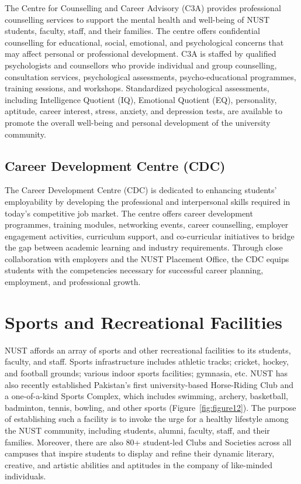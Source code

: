 The Centre for Counselling and Career Advisory (C3A) provides professional counselling services to support the mental health and well-being of NUST students, faculty, staff, and their families. The centre offers confidential counselling for educational, social, emotional, and psychological concerns that may affect personal or professional development. C3A is staffed by qualified psychologists and counsellors who provide individual and group counselling, consultation services, psychological assessments, psycho-educational programmes, training sessions, and workshops. Standardized psychological assessments, including Intelligence Quotient (IQ), Emotional Quotient (EQ), personality, aptitude, career interest, stress, anxiety, and depression tests, are available to promote the overall well-being and personal development of the university community.

\subsection{Career Development Centre (CDC)}

The Career Development Centre (CDC) is dedicated to enhancing students' employability by developing the professional and interpersonal skills required in today's competitive job market. The centre offers career development programmes, training modules, networking events, career counselling, employer engagement activities, curriculum support, and co-curricular initiatives to bridge the gap between academic learning and industry requirements. Through close collaboration with employers and the NUST Placement Office, the CDC equips students with the competencies necessary for successful career planning, employment, and professional growth.


\hypertarget{sport-and-recreational-facilities}{%
\section{Sports and Recreational Facilities}\label{sport-and-recreational-facilities}}

NUST affords an array of sports and other recreational facilities to its students, faculty, and staff. Sports infrastructure includes athletic tracks; cricket, hockey, and football grounds; various indoor sports facilities; gymnasia, etc. NUST has also recently established Pakistan's first university-based Horse-Riding Club and a one-of-a-kind Sports Complex, which includes swimming, archery, basketball, badminton, tennis, bowling, and other sports (Figure~\ref{fig:figure12}). The purpose of establishing such a facility is to invoke the urge for a healthy lifestyle among the NUST community, including students, alumni, faculty, staff, and their families. Moreover, there are also 80+ student-led Clubs and Societies across all campuses that inspire students to display and refine their dynamic literary, creative, and artistic abilities and aptitudes in the company of like-minded individuals.

